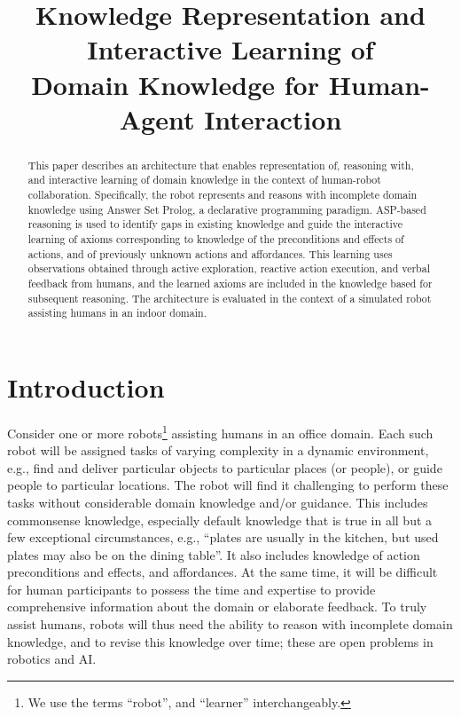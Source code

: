 \documentclass{article}
\title{Knowledge Representation and Interactive Learning of \\
Domain Knowledge for Human-Agent Interaction}
\begin{document}
\maketitle

\begin{abstract}
  This paper describes an architecture that enables representation of,
  reasoning with, and interactive learning of domain knowledge in the
  context of human-robot collaboration.  Specifically, the robot
  represents and reasons with incomplete domain knowledge using Answer
  Set Prolog, a declarative programming paradigm. ASP-based reasoning
  is used to identify gaps in existing knowledge and guide the
  interactive learning of axioms corresponding to knowledge of the
  preconditions and effects of actions, and of previously unknown
  actions and affordances.  This learning uses observations obtained
  through active exploration, reactive action execution, and verbal
  feedback from humans, and the learned axioms are included in the
  knowledge based for subsequent reasoning.  The architecture is
  evaluated in the context of a simulated robot assisting humans in an
  indoor domain.
\end{abstract}







\section{Introduction}
\label{sec:introduction}
Consider one or more robots\footnote{We use the terms ``robot'', and
  ``learner'' interchangeably.} assisting humans in an office domain.
Each such robot will be assigned tasks of varying complexity in a
dynamic environment, e.g., find and deliver particular objects to
particular places (or people), or guide people to particular
locations. The robot will find it challenging to perform these tasks
without considerable domain knowledge and/or guidance.  This includes
commonsense knowledge, especially default knowledge that is true in
all but a few exceptional circumstances, e.g., ``plates are usually in
the kitchen, but used plates may also be on the dining table''. It
also includes knowledge of action preconditions and effects, and
affordances. At the same time, it will be difficult for human
participants to possess the time and expertise to provide
comprehensive information about the domain or elaborate feedback. To
truly assist humans, robots will thus need the ability to reason with
incomplete domain knowledge, and to revise this knowledge over time;
these are open problems in robotics and AI.
\end{document}
